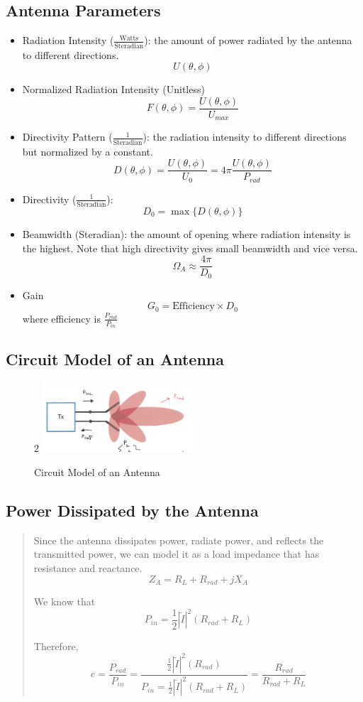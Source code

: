 \documentclass{article} %
\begin{document}
\subsection{Antenna Parameters}
\begin{itemize}
    \item Radiation Intensity ($\frac{\text{Watts}}{\text{Steradian}}$): the amount of power radiated by the antenna to different directions.
          \[U(\theta, \phi)\]
    \item Normalized Radiation Intensity (Unitless)
          \[F(\theta, \phi) = \frac{U(\theta, \phi)}{U_{max}}\]
    \item Directivity Pattern ($\frac{1}{\text{Steradian}}$): the radiation intensity to different directions but normalized by a constant.
          \[D(\theta, \phi) = \frac{U(\theta, \phi)}{U_0} = 4 \pi \frac{U(\theta, \phi)}{P_{rad}}\]
    \item Directivity ($\frac{1}{\text{Steradian}}$):
          \[D_0 = \max\{D(\theta, \phi)\}\]
    \item Beamwidth (Steradian): the amount of opening where radiation intensity is the highest. Note that high directivity gives small beamwidth and vice versa.
          \[\Omega_A \approx \frac{4\pi}{D_0} \]
    \item Gain
          \[G_0 = \text{Efficiency} \times D_0\]
          where efficiency is $\frac{P_{rad}}{P_{in}}$
\end{itemize}

\subsection{Circuit Model of an Antenna}
\begin{figure}[H]2
    \centering
    \includegraphics[width=0.5\textwidth]{./image/figure9.png}
    \caption{Circuit Model of an Antenna}
\end{figure}
\subsection{Power Dissipated by the Antenna}
\begin{quote}
    Since the antenna dissipates power, radiate power, and reflects the transmitted power, we can model it as a load impedance that has resistance and reactance.
    \[Z_A = R_L + R_{rad} + j X_A\]

    We know that
    \[P_{in} = \frac{1}{2}|\tilde{I}|^2 (R_{rad} + R_L)\]

    Therefore,
    \[e = \frac{P_{rad}}{P_{in}} = \frac{\frac{1}{2}|\tilde{I}|^2 (R_{rad})}{P_{in} = \frac{1}{2}|\tilde{I}|^2 (R_{rad} + R_L)} = \frac{R_{rad}}{R_{rad} + R_L}\]
\end{quote}
\end{document}
